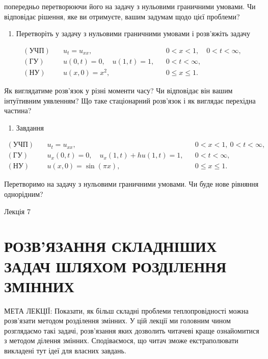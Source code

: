 \documentclass[
  ukrainian,
]{article}
\providecommand{\tightlist}{%
  \setlength{\itemsep}{0pt}\setlength{\parskip}{0pt}}
\begin{document}
попередньо перетворюючи його на задачу з нульовими граничними умовами.
Чи відповідає рішення, яке ви отримуєте, вашим задумам щодо цієї
проблеми?

\begin{enumerate}
\def\labelenumi{\arabic{enumi}.}
\setcounter{enumi}{1}
\tightlist
\item
  Перетворіть у задачу з нульовими граничними умовами і розв'яжіть
  задачу
\end{enumerate}

\[
\begin{aligned}
(\text{УЧП})\quad & u_t = u_{xx}, && 0 < x < 1,\quad 0 < t < \infty, \\
(\text{ГУ})\quad & u(0,t)=0,\quad u(1,t)=1, && 0 < t < \infty, \\
(\text{НУ})\quad & u(x,0)=x^2, && 0 \le x \le 1.
\end{aligned}
\]

Як виглядатиме розв'язок у різні моменти часу? Чи відповідає він вашим
інтуїтивним уявленням? Що таке стаціонарний розв'язок і як виглядає
перехідна частина?

\begin{enumerate}
\def\labelenumi{\arabic{enumi}.}
\setcounter{enumi}{2}
\tightlist
\item
  Завдання
\end{enumerate}

\[
\begin{aligned}
(\text{УЧП})\quad & u_t = u_{xx}, && 0 < x < 1,\ 0 < t < \infty, \\
(\text{ГУ})\quad & u_x(0,t) = 0,\quad u_x(1,t) + h u(1,t) = 1, && 0 < t < \infty, \\
(\text{НУ})\quad & u(x,0) = \sin(\pi x), && 0 \leqslant x \leqslant 1.
\end{aligned}
\]

Перетворимо на задачу з нульовими граничними умовами. Чи буде нове
рівняння однорідним?

Лекція 7

\section{РОЗВ'ЯЗАННЯ СКЛАДНІШИХ ЗАДАЧ ШЛЯХОМ РОЗДІЛЕННЯ
ЗМІННИХ}\label{ux440ux43eux437ux432ux44fux437ux430ux43dux43dux44f-ux441ux43aux43bux430ux434ux43dux456ux448ux438ux445-ux437ux430ux434ux430ux447-ux448ux43bux44fux445ux43eux43c-ux440ux43eux437ux434ux456ux43bux435ux43dux43dux44f-ux437ux43cux456ux43dux43dux438ux445}

МЕТА ЛЕКЦІЇ: Показати, як більш складні проблеми теплопровідності можна
розв'язати методом розділення змінних. У цій лекції ми головним чином
розглядаємо такі задачі, розв'язання яких дозволить читачеві краще
ознайомитися з методом ділення змінних. Сподіваємося, що читач зможе
екстраполювати викладені тут ідеї для власних завдань.
\end{document}
